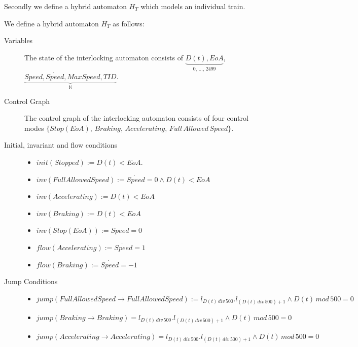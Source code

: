 Secondly we define a hybrid automaton $H_{T}$ which models an individual train. 

\begin{mydef}

We define a hybrid automaton $H_{T}$ as follows:
\begin{description}
\item[Variables] The state of the interlocking automaton consists of $\underbrace{D(t), EoA}_\text{0, \ldots , 2499}$, \newline $\underbrace{Speed, \dot{Speed}, MaxSpeed, TID}_{\mathbb{N}}$.

\item[Control Graph] The control graph of the interlocking automaton consists of four control modes $\{Stop (EoA), \, Braking, \, Accelerating, \, Full \, Allowed \, Speed \}$.

\item[Initial, invariant and flow conditions] \hspace*{0mm}
	\begin{itemize}
	\item $init(Stopped) :=   D(t) < EoA  $.

	\item $inv(Full Allowed Speed) :=   \dot{Speed} = 0 \wedge D(t) < EoA$ 

	\item $inv(Accelerating) := D(t) < EoA$

	\item $inv(Braking)  := D(t) < EoA$
	
	\item $inv(Stop (EoA)) := Speed = 0$ 

	\item $flow(Accelerating):= \dot{Speed} = 1$ 
	
	\item $flow(Braking) := \dot{Speed} = -1$
	
	\end{itemize}

\item[Jump Conditions] \hspace*{0mm}

	\begin{itemize}
	\item $jump(Full Allowed Speed \to Full Allowed Speed) := l_{D(t) \, div \, 500}.l_{(D(t) \, div \, 500) +1} \wedge D(t) \, mod \, 500 = 0$
\item $jump(Braking \to Braking) = l_{D(t) \, div \, 500}.l_{(D(t) \, div \, 500) +1} \wedge D(t) \, mod \, 500 = 0$
\item $jump(Accelerating \to Accelerating) = l_{D(t) \, div \, 500}.l_{(D(t) \, div \, 500) +1} \wedge D(t) \, mod \, 500 = 0$


\end{itemize}
\end{description}
\end{mydef}
